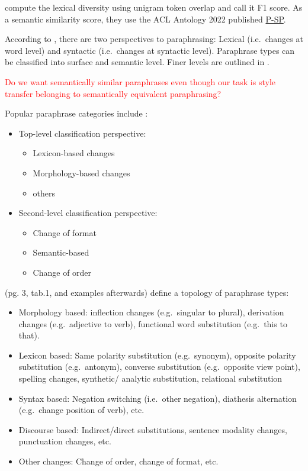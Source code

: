 \citet{krishna_paraphrasing_2023} compute the lexical diversity using unigram token overlap and call it F1 score.
As a semantic similarity score, they use the ACL Antology 2022 published \href{https://aclanthology.org/2022.emnlp-demos.38.pdf}{P-SP}.

According to \citet{gohsen_task_oriented_2024}, there are two perspectives to paraphrasing: 
Lexical (i.e.\ changes at word level) and syntactic (i.e.\ changes at syntactic level).
Paraphrase types can be classified into surface and semantic level. Finer levels are outlined in \citep{gohsen_task_oriented_2024}.

\textcolor{red}{Do we want semantically similar paraphrases even though our task is style transfer belonging to semantically equivalent paraphrasing?}

Popular paraphrase categories include \citep{fu_learning_2024}:
\begin{itemize}
    \item Top-level classification perspective: 
        \begin{itemize}
            \item Lexicon-based changes
            \item Morphology-based changes
            \item others
        \end{itemize}
    \item Second-level classification perspective:
        \begin{itemize}
            \item Change of format
            \item Semantic-based
            \item Change of order
        \end{itemize}
\end{itemize}
\citet{zhou_paraphrase_2025} (pg. 3, tab.1, and examples afterwards) define a topology of paraphrase types:
\begin{itemize}
    \item Morphology based: inflection changes (e.g.\ singular to plural), derivation changes (e.g.\ adjective to verb), functional word substitution (e.g.\ this to that).
    \item Lexicon based: Same polarity substitution (e.g.\ synonym), opposite polarity substitution (e.g.\ antonym), converse substitution (e.g.\ opposite view point), spelling changes, synthetic/ analytic substitution, relational substitution
    \item Syntax based: Negation switching (i.e.\ other negation), diathesis alternation (e.g.\ change position of verb), etc.
    \item Discourse based: Indirect/direct substitutions, sentence modality changes, punctuation changes, etc.
    \item Other changes: Change of order, change of format, etc.
\end{itemize}

